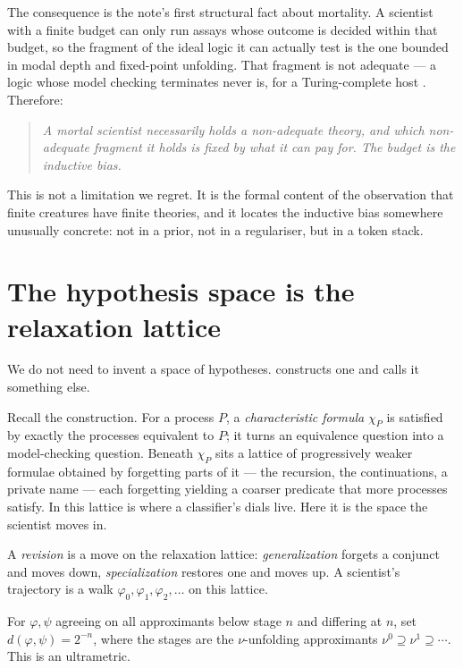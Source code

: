 The consequence is the note's first structural fact about mortality. A scientist with a finite budget
can only run assays whose outcome is decided within that budget, so the fragment of the ideal logic it
can actually test is the one bounded in modal depth and fixed-point unfolding. That fragment is not
adequate --- a logic whose model checking terminates never is, for a Turing-complete host
\cite[\S1.3]{ClassifierNote}. Therefore:

\begin{quote}
\itshape A mortal scientist necessarily holds a non-adequate theory, and which non-adequate fragment
it holds is fixed by what it can pay for. The budget is the inductive bias.
\end{quote}

This is not a limitation we regret. It is the formal content of the observation that finite creatures
have finite theories, and it locates the inductive bias somewhere unusually concrete: not in a prior,
not in a regulariser, but in a token stack.

\section{The hypothesis space is the relaxation lattice}\label{sci:S5}
\label{sci:sec:lattice}

We do not need to invent a space of hypotheses. \cite[\S3.3]{ClassifierNote} constructs one and calls
it something else.

Recall the construction. For a process $P$, a \emph{characteristic formula} $\chi_P$ is satisfied by
exactly the processes equivalent to $P$; it turns an equivalence question into a model-checking
question. Beneath $\chi_P$ sits a lattice of progressively weaker formulae obtained by forgetting
parts of it --- the recursion, the continuations, a private name --- each forgetting yielding a
coarser predicate that more processes satisfy. In \cite{ClassifierNote} this lattice is where a
classifier's dials live. Here it is the space the scientist moves in.

\begin{definition}[Revision]\label{sci:revision}
A \emph{revision} is a move on the relaxation lattice: \emph{generalization} forgets a conjunct and
moves down, \emph{specialization} restores one and moves up. A scientist's trajectory is a walk
$\varphi_0, \varphi_1, \varphi_2, \ldots$ on this lattice.
\end{definition}

\begin{definition}\label{sci:stratified-distance}
For $\varphi, \psi$ agreeing on all approximants below stage $n$ and differing at $n$, set
$d(\varphi, \psi) = 2^{-n}$, where the stages are the $\nu$-unfolding approximants
$\nu^0 \supseteq \nu^1 \supseteq \cdots$. This is an ultrametric.
\end{definition}

